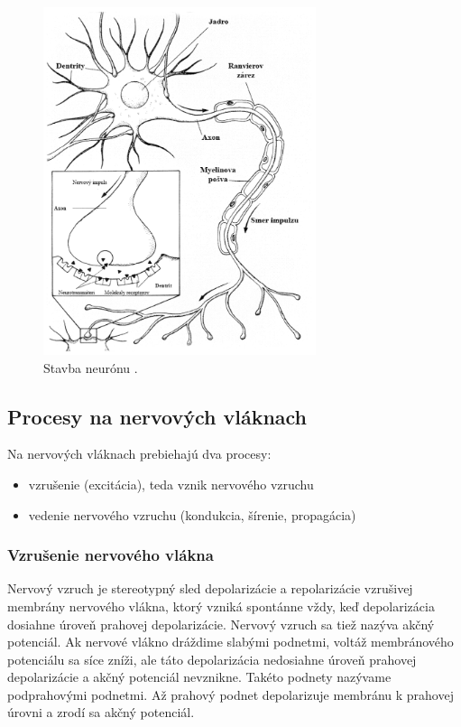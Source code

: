 \begin{figure}[!htbp]
  \centering
  \includegraphics[width=8cm]{img/neuron-schema.png}
  \caption{Stavba neurónu \cite{petrovicovaFyziologiaZivocichovCloveka2006}.}
  \label{neuron-stavba}
\end{figure}	

\subsection{Procesy na nervových vláknach}

Na nervových vláknach prebiehajú dva procesy: 
\begin{itemize}
  \item vzrušenie (excitácia), teda vznik nervového vzruchu
  \item vedenie nervového vzruchu (kondukcia, šírenie, propagácia)
\end{itemize}

\subsubsection{Vzrušenie nervového vlákna}

Nervový vzruch je stereotypný sled depolarizácie a repolarizácie vzrušivej membrány nervového vlákna, ktorý vzniká spontánne vždy, keď depolarizácia dosiahne úroveň prahovej depolarizácie.
Nervový vzruch sa tiež nazýva akčný potenciál. Ak nervové vlákno dráždime slabými podnetmi, voltáž membránového potenciálu sa síce zníži, ale táto depolarizácia nedosiahne úroveň prahovej
depolarizácie a akčný potenciál nevznikne. Takéto podnety nazývame podprahovými podnetmi. Až prahový podnet depolarizuje membránu k prahovej úrovni a zrodí sa akčný potenciál.

